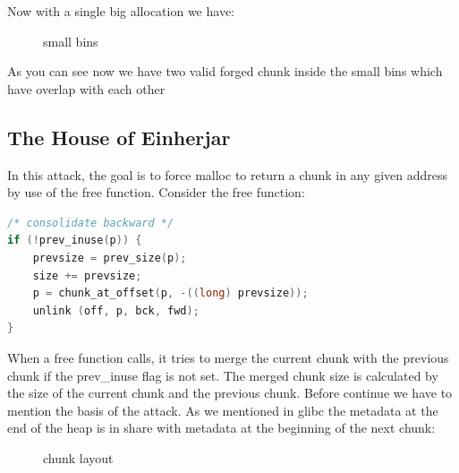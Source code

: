 \documentclass{masterthesis}
\newcommand*\libc{glibc}
\newcommand*\sbs{small bins}
\begin{document}
Now with a single big allocation we have:
\begin{figure}[h!]
  \caption{\sbs{}}
\end{figure}

As you can see now we have two valid forged chunk inside the \sbs{} which have overlap with each other

\subsection{The House of Einherjar}
In this attack, the goal is to force malloc to return a chunk in any given address by use of the free function. Consider the free function:

\begin{lstlisting}[language=c,frame=tlrb]
/* consolidate backward */
if (!prev_inuse(p)) {
    prevsize = prev_size(p);
    size += prevsize;
    p = chunk_at_offset(p, -((long) prevsize));
	unlink (off, p, bck, fwd);
} 
 \end{lstlisting}
When a free function calls, it tries to merge the current chunk with the previous chunk if the prev\_inuse flag is not set. The merged chunk size is calculated by the size of the current chunk and the previous chunk. Before continue we have to mention the basis of the attack. As we mentioned in \libc{} the metadata at the end of the heap is in share with metadata at the beginning of the next chunk: 

\begin{figure}[h!]
  \caption{chunk layout}
\end{figure}
\end{document}
